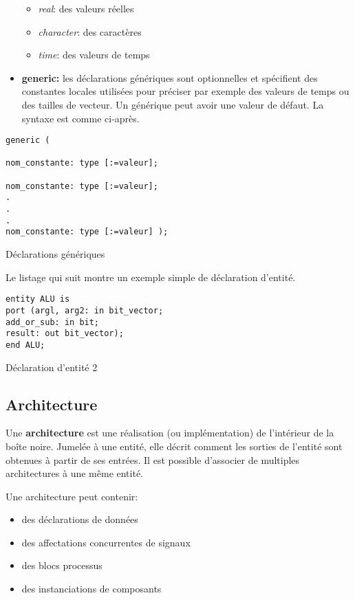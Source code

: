 \documentclass[11pt]{article}
\begin{document}
\begin{itemize}
\begin{itemize}
\item \emph{real}: des valeurs réelles

\item \emph{character}: des caractères

\item \emph{time}: des valeurs de temps
\end{itemize}

\item \textbf{generic:} les déclarations génériques sont optionnelles et
spécifient des constantes locales utilisées pour préciser par
exemple des valeurs de temps ou des tailles de vecteur. Un
générique peut avoir une valeur de défaut. La syntaxe est comme
ci-après.
\end{itemize}

\begin{listing}[htbp]
\begin{verbatim}
generic (

nom_constante: type [:=valeur];

nom_constante: type [:=valeur];
.
.
.
nom_constante: type [:=valeur] );
\end{verbatim}
\caption{Déclarations génériques}
\end{listing}


Le listage qui suit montre un exemple simple de déclaration d'entité. 

\begin{listing}[htbp]
\begin{verbatim}
entity ALU is
port (argl, arg2: in bit_vector;
add_or_sub: in bit;
result: out bit_vector);
end ALU;
\end{verbatim}
\caption{Déclaration d'entité 2}
\end{listing}

\subsection{Architecture}
\label{sec:org43d19cc}

Une \textbf{architecture} est une réalisation (ou implémentation) de
l'intérieur de la boîte noire. Jumelée à une entité, elle décrit
comment les sorties de l'entité sont obtenues à partir de ses
entrées. Il est possible d'associer de multiples architectures à une
même entité.

Une architecture peut contenir:

\begin{itemize}
\item des déclarations de données

\item des affectations concurrentes de signaux

\item des blocs processus

\item des instanciations de composants
\end{itemize}
\end{document}

